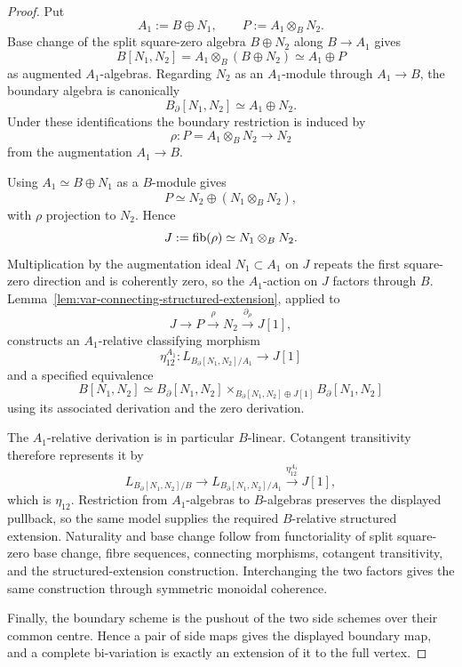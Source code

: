 \begin{proof}
Put
\[
    A_1:=B\oplus N_1,
    \qquad
    P:=A_1\otimes_BN_2.
\]
Base change of the split square-zero algebra \(B\oplus N_2\) along \(B\to A_1\) gives
\[
    B[N_1,N_2]
    =
    A_1\otimes_B(B\oplus N_2)
    \simeq
    A_1\oplus P
\]
as augmented \(A_1\)-algebras.  Regarding \(N_2\) as an \(A_1\)-module through \(A_1\to B\), the boundary algebra is canonically
\[
    B_{\partial}[N_1,N_2]
    \simeq
    A_1\oplus N_2.
\]
Under these identifications the boundary restriction is induced by
\[
    \rho:
    P=A_1\otimes_BN_2
    \longrightarrow
    N_2
\]
from the augmentation \(A_1\to B\).

Using \(A_1\simeq B\oplus N_1\) as a \(B\)-module gives
\[
    P\simeq N_2\oplus(N_1\otimes_BN_2),
\]
with \(\rho\) projection to \(N_2\).  Hence
\[
    J:=\operatorname{fib}(\rho)
    \simeq
    N_1\otimes_BN_2.
\]
Multiplication by the augmentation ideal \(N_1\subset A_1\) on \(J\) repeats the first square-zero direction and is coherently zero, so the \(A_1\)-action on \(J\) factors through \(B\).  Lemma~\ref{lem:var-connecting-structured-extension}, applied to
\[
    J\longrightarrow P\xrightarrow{\rho}N_2
    \xrightarrow{\partial_\rho}J[1],
\]
constructs an \(A_1\)-relative classifying morphism
\[
    \eta_{12}^{A_1}:
    L_{B_{\partial}[N_1,N_2]/A_1}
    \longrightarrow
    J[1]
\]
and a specified equivalence
\[
    B[N_1,N_2]
    \simeq
    B_{\partial}[N_1,N_2]
    \times_{B_{\partial}[N_1,N_2]\oplus J[1]}
    B_{\partial}[N_1,N_2]
\]
using its associated derivation and the zero derivation.

The \(A_1\)-relative derivation is in particular \(B\)-linear.  Cotangent transitivity therefore represents it by
\[
    L_{B_{\partial}[N_1,N_2]/B}
    \longrightarrow
    L_{B_{\partial}[N_1,N_2]/A_1}
    \xrightarrow{\eta_{12}^{A_1}}
    J[1],
\]
which is \(\eta_{12}\).  Restriction from \(A_1\)-algebras to \(B\)-algebras preserves the displayed pullback, so the same model supplies the required \(B\)-relative structured extension.  Naturality and base change follow from functoriality of split square-zero base change, fibre sequences, connecting morphisms, cotangent transitivity, and the structured-extension construction.  Interchanging the two factors gives the same construction through symmetric monoidal coherence.

Finally, the boundary scheme is the pushout of the two side schemes over their common centre.  Hence a pair of side maps gives the displayed boundary map, and a complete bi-variation is exactly an extension of it to the full vertex.
\end{proof}

